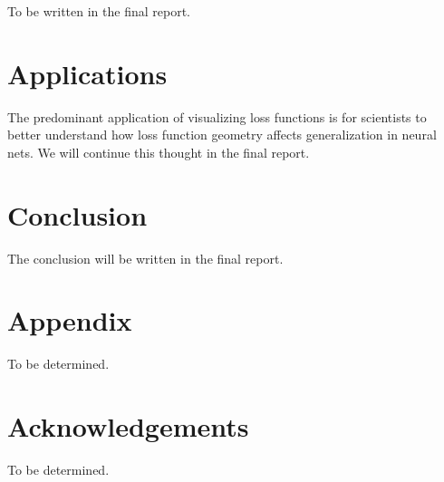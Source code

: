 \documentclass{acmsiggraph}               %
\begin{document}
To be written in the final report.



\section{Applications}
\label{sec:application}

The predominant application of visualizing loss functions is for scientists to better understand how loss function geometry affects generalization in neural nets. 
We will continue this thought in the final report.





\section{Conclusion}
\label{sec:conclusion}

The conclusion will be written in the final report.


\section*{Appendix}
\label{sec:higher_tensors}

To be determined.

\section*{Acknowledgements}

To be determined.



\nocite{*}

\end{document}
